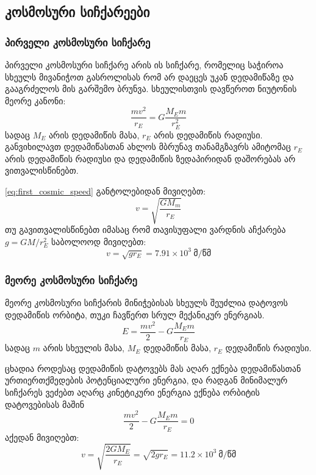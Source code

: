 \documentclass[a4paper]{book}
\begin{document}
\subsection{კოსმოსური სიჩქარეები}
\subsubsection{პირველი კოსმოსური სიჩქარე}
პირველი კოსმოსური სიჩქარე არის ის სიჩქარე, რომელიც საჭიროა სხეულს მივანიჭოთ გასროლისას რომ არ დაეცეს უკან დედამიწაზე და გააგრძელოს მის გარშემო ბრუნვა. სხეულისთვის დავწეროთ ნიუტონის მეორე კანონი:
		\begin{equation}
			\frac{mv^2}{r_E} = G\frac{M_Em}{r_E^2}
			\label{eq:first_cosmic_speed}
		\end{equation}
სადაც $M_E$ არის დედამიწის მასა, $r_E$ არის დედამიწის რადიუსი. განვიხილავთ დედამიწასთან ახლოს მბრუნავ თანამგზავრს ამიტომაც $r_E$ არის დედამიწის რადიუსი და დედამიწის ზედაპირიდან დაშორებას არ ვითვალისწინებთ.

\ref{eq:first_cosmic_speed} განტოლებიდან მივიღებთ:
	\begin{equation}
		v = \sqrt{\frac{G M_m}{r_E}}
	\end{equation}
თუ გავითვალისწინებთ იმასაც რომ თავისუფალი ვარდნის აჩქარება $g = GM/r_E^2$ საბოლოოდ მივიღებთ:
	\begin{equation}
		v = \sqrt{g r_E} = 7.91 \times 10^3 ~ \text{მ/წმ}
	\end{equation}
	
\subsubsection{მეორე კოსმოსური სიჩქარე}
მეორე კოსმოსური სიჩქარის მინიჭებისას სხეულს შეუძლია დატოვოს დედამიწის ორბიტა, თუკი ჩავწერთ სრულ მექანიკურ ენერგიას. 
			\begin{equation}
				E = \frac{mv^2}{2} - G\frac{M_E m}{r_E}
			\end{equation}
სადაც $m$ არის სხეულის მასა, $M_E$ დედამიწის მასა, $r_E$ დედამიწის რადიუსი. 

ცხადია როდესაც დედამიწის დატოვებს მას აღარ ექნება დედამიწასთან ურთიერთქმედების პოტენციალური ენერგია, და რადგან მინიმალურ სიჩქარეს ვეძებთ აღარც კინეტიკური ენერგია ექნება ორბიტის დატოვებისას მაშინ
			\begin{equation}
				\frac{mv^2}{2} - G\frac{M_E m}{r_E} = 0
			\end{equation}
აქედან მივიღებთ:
			\begin{equation}
				v = \sqrt{\frac{2GM_E}{r_E}} = \sqrt{2 g r_E} = 11.2 \times 10^3 ~ \text{მ/წმ}
			\end{equation}
\end{document}
